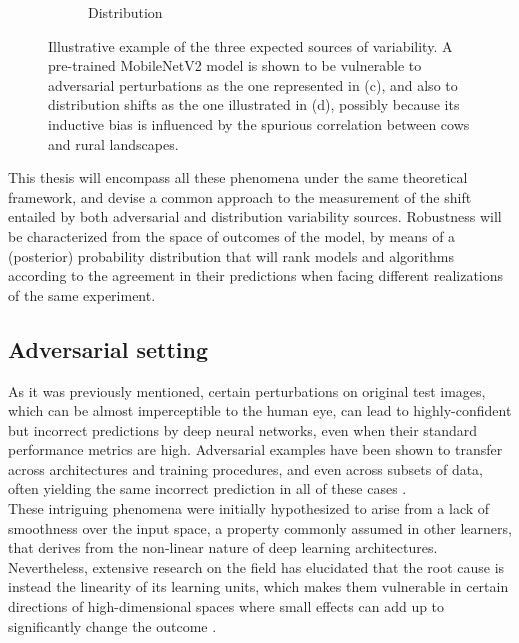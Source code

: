 \begin{figure}
\begin{subfigure}[b]{0.22\textwidth}
        \caption{Distribution}
    \end{subfigure}
       \caption{Illustrative example of the three expected sources of variability. 
       A pre-trained MobileNetV2 model is shown to be vulnerable to adversarial perturbations 
       as the one represented in (c), and also to distribution shifts 
       as the one illustrated in (d), possibly because its inductive bias is influenced
       by the spurious correlation between cows and rural landscapes.}
       \label{fig:cows}
\end{figure}

This thesis will encompass all these phenomena under the same theoretical
framework, and devise a common approach to the measurement of
the shift entailed by both adversarial and distribution
variability sources. Robustness will be characterized from the space of
outcomes of the model, by means of a (posterior) probability 
distribution that will rank models and algorithms according to the
agreement in their predictions when facing different realizations of the same experiment.

\subsection{Adversarial setting}

As it was previously mentioned, certain perturbations on
original test images, which can be almost imperceptible
to the human eye, can lead to highly-confident but
incorrect predictions by deep neural networks, even when their
standard performance metrics are high.
Adversarial examples have been shown to transfer
across architectures and training procedures, and
even across subsets of data,
often yielding the same incorrect prediction in
all of these cases \cite{szegedyIntriguingPropertiesNeural2014}. \\

These intriguing phenomena were initially hypothesized to arise 
from a lack of smoothness over the input space, a property
commonly assumed in other learners, that derives from the
non-linear nature of deep learning architectures. Nevertheless,
extensive research on the field has elucidated that the root
cause is instead the linearity of its learning units, which makes them
vulnerable in certain directions of high-dimensional
spaces where small
effects can add up to significantly change the outcome
\cite{goodfellowExplainingHarnessingAdversarial2015}. \\

